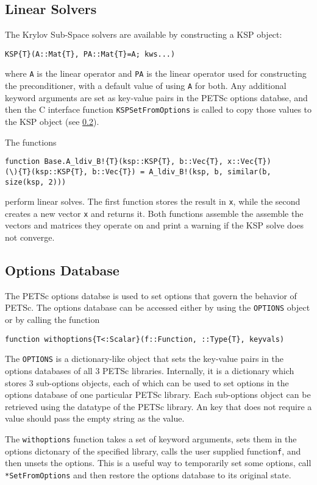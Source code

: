\documentclass{article}
\newcommand{\ttt}{\texttt}
\begin{document}
\subsection{Linear Solvers} \label{sec:ksp}
The Krylov Sub-Space solvers are available by constructing a KSP object:
\begin{verbatim}
KSP{T}(A::Mat{T}, PA::Mat{T}=A; kws...)
\end{verbatim}

where \ttt{A} is the linear operator and \ttt{PA}  is the linear operator used for constructing the preconditioner, with a default value of using \ttt{A} for both.
Any additional keyword arguments are set as key-value pairs in the PETSc options databse, and then the C interface function \ttt{KSPSetFromOptions} is called to copy those values to the KSP object (see \ref{sec:options}).

The functions
\begin{verbatim}
function Base.A_ldiv_B!{T}(ksp::KSP{T}, b::Vec{T}, x::Vec{T})
(\){T}(ksp::KSP{T}, b::Vec{T}) = A_ldiv_B!(ksp, b, similar(b, size(ksp, 2)))
\end{verbatim}
perform linear solves.
The first function stores the result in \ttt{x}, while the second creates a new vector \ttt{x} and returns it.
Both functions assemble the assemble the vectors and matrices they operate on and print a warning if the KSP solve does not converge.


\subsection{Options Database} \label{sec:options}
The PETSc options databse is used to set options that govern the behavior of PETSc.
The options database can be accessed either by using the \ttt{OPTIONS} object or by calling the function 

\begin{verbatim}
function withoptions{T<:Scalar}(f::Function, ::Type{T}, keyvals)
\end{verbatim}

The \ttt{OPTIONS} is a dictionary-like object that sets the key-value pairs in the options databases of all 3 PETSc libraries.
Internally, it is a dictionary which stores 3 sub-options objects, each of which can be used to set options in the options database of one particular PETSc library.
Each sub-options object can be retrieved using the datatype of the PETSc library.
An key that does not require a value should pass the empty string as the value.

The \ttt{withoptions} function takes a set of keyword arguments, sets them in the options dictonary of the specified library, calls the user supplied function\ttt{f}, and then unsets the options.
This is a useful way to temporarily set some options, call \ttt{*SetFromOptions} and then restore the options database to its original state.
\end{document}

